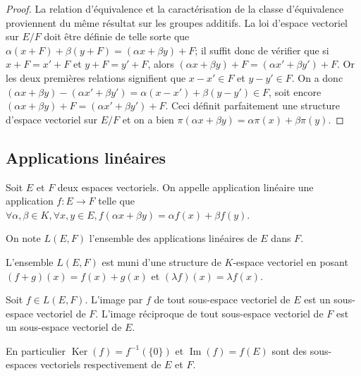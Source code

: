 \begin{proof}
La relation d'équivalence et la caractérisation de la classe d'équivalence proviennent du même résultat sur les groupes additifs. La loi d'espace vectoriel sur $E/F$ doit être définie de telle sorte que $\alpha(x + F) + \beta(y + F) = (\alpha x + \beta y) + F$; il suffit donc de vérifier que si $x + F = x' + F$ et $y + F = y' + F$, alors $(\alpha x + \beta y) + F = (\alpha x' + \beta y') + F$. Or les deux premières relations signifient que $x - x' \in F$ et $y - y' \in F$. On a donc $(\alpha x + \beta y) - (\alpha x' + \beta y') = \alpha(x - x') + \beta(y - y') \in F$, soit encore $(\alpha x + \beta y) + F = (\alpha x' + \beta y') + F$. Ceci définit parfaitement une structure d'espace vectoriel sur $E/F$ et on a bien $\pi(\alpha x + \beta y) = \alpha\pi(x) + \beta\pi(y)$.
\end{proof}

\subsection{Applications linéaires}

\begin{de}
Soit $E$ et $F$ deux espaces vectoriels. On appelle application linéaire une application $f : E \to F$ telle que $\forall \alpha,\beta \in K, \forall x,y \in E, f(\alpha x + \beta y) = \alpha f(x) + \beta f(y)$.
\end{de}

\begin{rem}
On note $L(E,F)$ l'ensemble des applications linéaires de $E$ dans $F$.
\end{rem}

\begin{prop}
L'ensemble $L(E,F)$ est muni d'une structure de $K$-espace vectoriel en posant $(f + g)(x) = f(x) + g(x)$ et $(\lambda f)(x) = \lambda f(x)$.
\end{prop}

\begin{prop}
Soit $f \in L(E,F)$. L'image par $f$ de tout sous-espace vectoriel de $E$ est un sous-espace vectoriel de $F$. L'image réciproque de tout sous-espace vectoriel de $F$ est un sous-espace vectoriel de $E$.
\end{prop}

\begin{rem}
En particulier $\operatorname{Ker}(f) = f^{-1}(\{0\})$ et $\operatorname{Im}(f) = f(E)$ sont des sous-espaces vectoriels respectivement de $E$ et $F$.
\end{rem}

